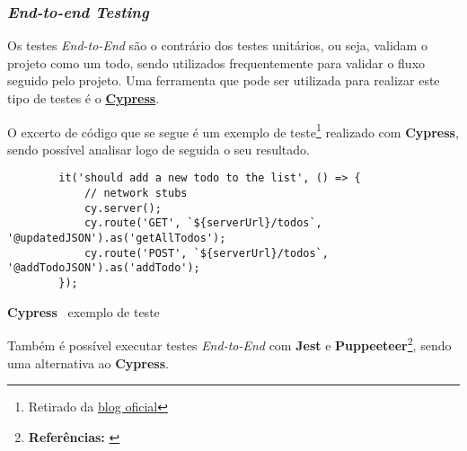 \subsubsection{\textit{End-to-end Testing}}

Os testes \textit{End-to-End} são o contrário dos testes unitários, ou seja, validam o projeto como um todo, sendo utilizados frequentemente para validar o fluxo seguido pelo projeto. Uma ferramenta que pode ser utilizada para realizar este tipo de testes é o \textbf{\href{https://cypress.io}{Cypress}}.

O excerto de código que se segue é um exemplo de teste\footnote{Retirado da \href{https://www.cypress.io/blog/2019/02/05/modern-frontend-testing-with-cypress/}{blog oficial}} realizado com \textbf{Cypress}, sendo possível analisar logo de seguida o seu resultado.

\begin{longlisting}
	\begin{verbatim}
		it('should add a new todo to the list', () => {
			// network stubs
			cy.server();
			cy.route('GET', `${serverUrl}/todos`, '@updatedJSON').as('getAllTodos');
			cy.route('POST', `${serverUrl}/todos`, '@addTodoJSON').as('addTodo');
		});
	\end{verbatim}
	\caption{\textbf{Cypress} \textemdash~exemplo de teste}
\end{longlisting}


Também é possível executar testes \textit{End-to-End} com \textbf{Jest} e \textbf{Puppeeteer}\footnote{\textbf{Referências:} \cite{endToEndJestPuppeteer,endToEndWJest}}, sendo uma alternativa ao \textbf{Cypress}.

